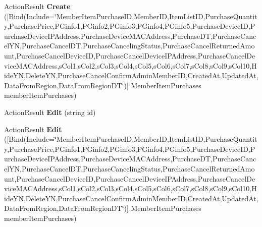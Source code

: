 \begin{DoxyCompactItemize}
\item 
Action\+Result {\bfseries Create} (\mbox{[}Bind(Include=\char`\"{}Member\+Item\+Purchase\+ID,Member\+ID,Item\+List\+ID,Purchase\+Quantity,Purchase\+Price,P\+Ginfo1,P\+Ginfo2,P\+Ginfo3,P\+Ginfo4,P\+Ginfo5,Purchase\+Device\+ID,Purchase\+Device\+I\+P\+Address,Purchase\+Device\+M\+A\+C\+Address,Purchase\+DT,Purchase\+Cancel\+YN,Purchase\+Cancel\+DT,Purchase\+Canceling\+Status,Purchase\+Cancel\+Returned\+Amount,Purchase\+Cancel\+Device\+ID,Purchase\+Cancel\+Device\+I\+P\+Address,Purchase\+Cancel\+Device\+M\+A\+C\+Address,s\+Col1,s\+Col2,s\+Col3,s\+Col4,s\+Col5,s\+Col6,s\+Col7,s\+Col8,s\+Col9,s\+Col10,Hide\+YN,Delete\+YN,Purchase\+Cancel\+Confirm\+Admin\+Member\+ID,Created\+At,Updated\+At,Data\+From\+Region,Data\+From\+Region\+DT\char`\"{})\mbox{]} Member\+Item\+Purchases member\+Item\+Purchases)\hypertarget{class_cloud_bread_admin_web_1_1_controllers_1_1_member_item_purchases_controller_aa2ba065524f7cccc9e80fbb4d5ebbfd3}{}\label{class_cloud_bread_admin_web_1_1_controllers_1_1_member_item_purchases_controller_aa2ba065524f7cccc9e80fbb4d5ebbfd3}

\item 
Action\+Result {\bfseries Edit} (string id)\hypertarget{class_cloud_bread_admin_web_1_1_controllers_1_1_member_item_purchases_controller_a465a7d320582011642549fd1ee216fde}{}\label{class_cloud_bread_admin_web_1_1_controllers_1_1_member_item_purchases_controller_a465a7d320582011642549fd1ee216fde}

\item 
Action\+Result {\bfseries Edit} (\mbox{[}Bind(Include=\char`\"{}Member\+Item\+Purchase\+ID,Member\+ID,Item\+List\+ID,Purchase\+Quantity,Purchase\+Price,P\+Ginfo1,P\+Ginfo2,P\+Ginfo3,P\+Ginfo4,P\+Ginfo5,Purchase\+Device\+ID,Purchase\+Device\+I\+P\+Address,Purchase\+Device\+M\+A\+C\+Address,Purchase\+DT,Purchase\+Cancel\+YN,Purchase\+Cancel\+DT,Purchase\+Canceling\+Status,Purchase\+Cancel\+Returned\+Amount,Purchase\+Cancel\+Device\+ID,Purchase\+Cancel\+Device\+I\+P\+Address,Purchase\+Cancel\+Device\+M\+A\+C\+Address,s\+Col1,s\+Col2,s\+Col3,s\+Col4,s\+Col5,s\+Col6,s\+Col7,s\+Col8,s\+Col9,s\+Col10,Hide\+YN,Delete\+YN,Purchase\+Cancel\+Confirm\+Admin\+Member\+ID,Created\+At,Updated\+At,Data\+From\+Region,Data\+From\+Region\+DT\char`\"{})\mbox{]} Member\+Item\+Purchases member\+Item\+Purchases)\hypertarget{class_cloud_bread_admin_web_1_1_controllers_1_1_member_item_purchases_controller_a2a260038127b2200087967d4b7a09ce8}{}\label{class_cloud_bread_admin_web_1_1_controllers_1_1_member_item_purchases_controller_a2a260038127b2200087967d4b7a09ce8}


\end{DoxyCompactItemize}
